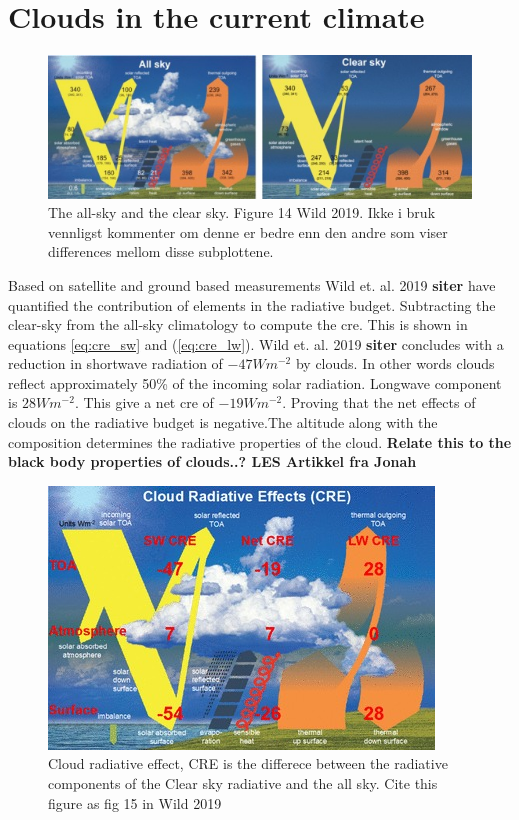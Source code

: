 \section{Clouds in the current climate} \label{sec:intro_cloud_current_climate}
\begin{figure}[h] %
    \centering
    \includegraphics[scale = 7]{Chapter1_Intro/images/both_wild2019.jpg}
    \caption{The all-sky and the clear sky. Figure 14 Wild 2019. Ikke i bruk vennligst kommenter om denne er bedre enn den andre som viser differences mellom disse subplottene.}
    \label{fig:both_wild}
\end{figure}

Based on satellite and ground based measurements Wild et. al. 2019 \textbf{siter} have quantified the contribution of elements in the radiative budget. Subtracting the clear-sky from the all-sky climatology to compute the \acrfull{cre}. This is shown in equations \eqref{eq:cre_sw} and (\ref{eq:cre_lw}). Wild et. al. 2019 \textbf{siter} concludes with a reduction in shortwave radiation of $-47Wm^{-2}$ by clouds. In other words clouds reflect approximately 50\% of the incoming solar radiation. Longwave component is $28Wm^{-2}$. This give a net \acrshort{cre} of $-19Wm^{-2}$. Proving that the net effects of clouds on the radiative budget is negative.The altitude along with the composition determines the radiative properties of the cloud. \textbf{Relate this to the black body properties of clouds..? LES Artikkel fra Jonah}
\begin{figure}[h]
    \centering
    \includegraphics[scale = 7]{Chapter1_Intro/images/CRE_wild2019.jpg}
    \caption{Cloud radiative effect, CRE is the differece between the radiative components of the Clear sky radiative and the all sky. Cite this figure as fig 15 in Wild 2019}
    \label{fig:cre}
\end{figure}

